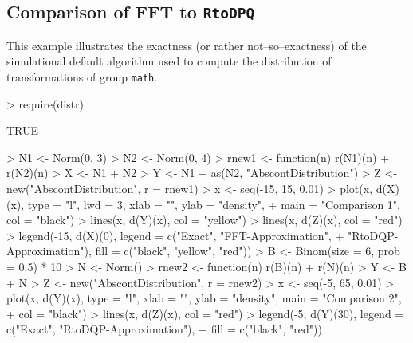 \documentclass[11pt]{article}
\begin{document}
\subsection{Comparison of FFT to {\tt RtoDPQ}}\label{compex}
\begin{small}
  This example illustrates the exactness (or rather not--so--exactness) of the simulational default algorithm used to compute
  the distribution of transformations of group {\tt math}.
\end{small}
\begin{Schunk}
\begin{Sinput}
> require(distr)
\end{Sinput}
\begin{Soutput}
[1] TRUE
\end{Soutput}
\begin{Sinput}
> N1 <- Norm(0, 3)
> N2 <- Norm(0, 4)
> rnew1 <- function(n) r(N1)(n) + r(N2)(n)
> X <- N1 + N2
> Y <- N1 + as(N2, "AbscontDistribution")
> Z <- new("AbscontDistribution", r = rnew1)
> x <- seq(-15, 15, 0.01)
> plot(x, d(X)(x), type = "l", lwd = 3, xlab = "", ylab = "density", 
+     main = "Comparison 1", col = "black")
> lines(x, d(Y)(x), col = "yellow")
> lines(x, d(Z)(x), col = "red")
> legend(-15, d(X)(0), legend = c("Exact", "FFT-Approximation", 
+     "RtoDQP-Approximation"), fill = c("black", "yellow", "red"))
> B <- Binom(size = 6, prob = 0.5) * 10
> N <- Norm()
> rnew2 <- function(n) r(B)(n) + r(N)(n)
> Y <- B + N
> Z <- new("AbscontDistribution", r = rnew2)
> x <- seq(-5, 65, 0.01)
> plot(x, d(Y)(x), type = "l", xlab = "", ylab = "density", main = "Comparison 2", 
+     col = "black")
> lines(x, d(Z)(x), col = "red")
> legend(-5, d(Y)(30), legend = c("Exact", "RtoDQP-Approximation"), 
+     fill = c("black", "red"))
\end{Sinput}
\end{Schunk}
\end{document}
